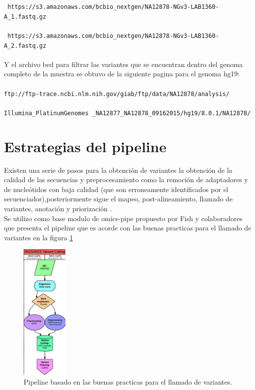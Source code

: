 {\texttt{ https://s3.amazonaws.com/bcbio\_nextgen/NA12878-NGv3-LAB1360-A\_1.fastq.gz}\\
\\
{\texttt{ https://s3.amazonaws.com/bcbio\_nextgen/NA12878-NGv3-LAB1360-A\_2.fastq.gz}}\\
\\
Y el archivo bed para filtrar las variantes que se encuentran dentro del genoma completo de la muestra se obtuvo de la siguiente pagina para el genoma hg19: \\
\\
\texttt{ftp://ftp-trace.ncbi.nlm.nih.gov/giab/ftp/data/NA12878/analysis/}\\
\\
\texttt{Illumina\_PlatinumGenomes \_NA12877\_NA12878\_09162015/hg19/8.0.1/NA12878/} 

\section{Estrategias del pipeline}

Existen una serie de pasos para la obtención de variantes la obtención de la calidad de las secuencias y preprocesamiento como la remoción de adaptadores y de nucleótidos con baja calidad (que son erroneamente identificados por el secuenciador),posteriormente sigue el mapeo, post-alineamiento, llamado de variantes, anotación y priorización \cite{Bao2014}.\\

Se utilizo como base modulo de omics-pipe propuesto por Fish y colaboradores \cite{Fisch2015} que presenta el pipeline que es acorde con las buenas practicas para el llamado de variantes en la figura \ref{fig:pipeline}
	
\begin{figure}[] 
	\centering
	\includegraphics[width=0.2\textwidth]{Kap2/pipe}
	\caption{Pipeline basado en las buenas practicas para el llamado de variantes.} \label{fig:pipeline}
\end{figure}
	
}
